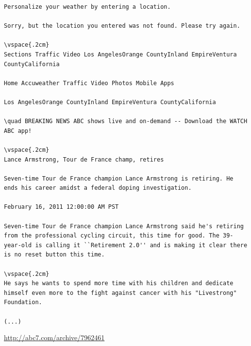 \documentclass[a4paper,12pt,titlepage=false]{scrreprt}
\begin{document}
\begin{lstlisting}[breaklines=true]
Personalize your weather by entering a location.

Sorry, but the location you entered was not found. Please try again.

\vspace{.2cm}
Sections Traffic Video Los AngelesOrange CountyInland EmpireVentura CountyCalifornia

Home Accuweather Traffic Video Photos Mobile Apps

Los AngelesOrange CountyInland EmpireVentura CountyCalifornia

\quad BREAKING NEWS ABC shows live and on-demand -- Download the WATCH ABC app!

\vspace{.2cm}
Lance Armstrong, Tour de France champ, retires

Seven-time Tour de France champion Lance Armstrong is retiring. He ends his career amidst a federal doping investigation.

February 16, 2011 12:00:00 AM PST

Seven-time Tour de France champion Lance Armstrong said he's retiring from the professional cycling circuit, this time for good. The 39-year-old is calling it ``Retirement 2.0'' and is making it clear there is no reset button this time.

\vspace{.2cm}
He says he wants to spend more time with his children and dedicate himself even more to the fight against cancer with his "Livestrong" Foundation.

(...)
\end{lstlisting}

\vspace{.2cm}
\url{http://abc7.com/archive/7962461}
\end{document}
